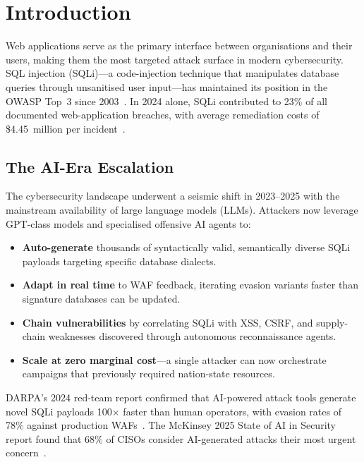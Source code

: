 \documentclass[10pt,twocolumn]{article}
\begin{document}
\section{Introduction}

Web applications serve as the primary interface between organisations and
their users, making them the most targeted attack surface in modern
cybersecurity. SQL injection (SQLi)---a code-injection technique that
manipulates database queries through unsanitised user input---has maintained
its position in the OWASP Top~3 since 2003~\cite{owasp2024}. In 2024 alone,
SQLi contributed to 23\% of all documented web-application breaches, with
average remediation costs of \$4.45~million per incident~\cite{ibm2024}.

\subsection{The AI-Era Escalation}

The cybersecurity landscape underwent a seismic shift in 2023--2025 with
the mainstream availability of large language models (LLMs). Attackers now
leverage GPT-class models and specialised offensive AI agents to:

\begin{itemize}[leftmargin=*,itemsep=1pt,topsep=2pt]
  \item \textbf{Auto-generate} thousands of syntactically valid, semantically
        diverse SQLi payloads targeting specific database dialects.
  \item \textbf{Adapt in real time} to WAF feedback, iterating evasion
        variants faster than signature databases can be updated.
  \item \textbf{Chain vulnerabilities} by correlating SQLi with XSS,
        CSRF, and supply-chain weaknesses discovered through autonomous
        reconnaissance agents.
  \item \textbf{Scale at zero marginal cost}---a single attacker can now
        orchestrate campaigns that previously required nation-state resources.
\end{itemize}

DARPA's 2024 red-team report confirmed that AI-powered attack tools generate
novel SQLi payloads 100$\times$ faster than human operators, with evasion
rates of 78\% against production WAFs~\cite{darpa2024}. The McKinsey 2025
State of AI in Security report found that 68\% of CISOs consider AI-generated
attacks their most urgent concern~\cite{mckinsey2025}.
\end{document}

